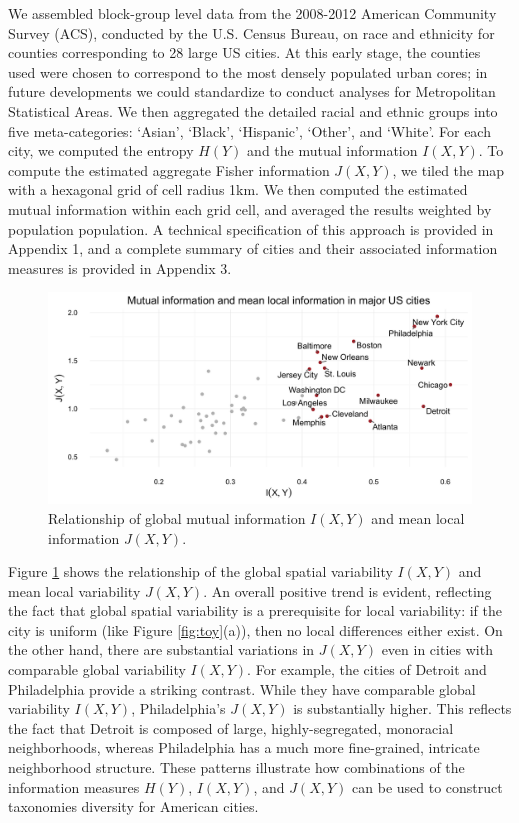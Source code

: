 We assembled block-group level data from the 2008-2012 American Community Survey (ACS), conducted by the U.S. Census Bureau, on race and ethnicity for counties corresponding to 28 large US cities. At this early stage, the counties used were chosen to correspond to the most densely populated urban cores; in future developments we could standardize to conduct analyses for Metropolitan Statistical Areas. We then aggregated the detailed racial and ethnic groups into five meta-categories: `Asian', `Black', `Hispanic', `Other', and `White'. For each city, we computed the entropy $H(Y)$ and the mutual information $I(X,Y)$. To compute the estimated aggregate Fisher information $J(X,Y)$, we tiled the map with a hexagonal grid of cell radius 1km. We then computed the estimated mutual information within each grid cell, and averaged the results weighted by population population. A technical specification of this approach is provided in Appendix 1, and a complete summary of cities and their associated information measures is provided in Appendix 3. 
		
	\begin{figure}
		\includegraphics[width=1\textwidth]{figs/mutual_fisher.png}
		\caption{Relationship of global mutual information $I(X,Y)$ and mean local information $J(X,Y)$.} 
		\label{fig:info_cross}
	\end{figure}	
Figure \ref{fig:info_cross} shows the relationship of the global spatial variability $I(X,Y)$ and mean local variability $J(X,Y)$. An overall positive trend is evident, reflecting the fact that global spatial variability is a prerequisite for local variability: if the city is uniform (like Figure \ref{fig:toy}(a)), then no local differences either exist.  On the other hand, there are substantial variations in $J(X,Y)$ even in cities with comparable global variability $I(X,Y)$. For example, the cities of Detroit and Philadelphia provide a striking contrast. While they have comparable global variability $I(X,Y)$, Philadelphia's $J(X,Y)$ is substantially higher. This reflects the fact that Detroit is composed of large, highly-segregated, monoracial neighborhoods, whereas Philadelphia has a much more fine-grained, intricate neighborhood structure. These patterns illustrate how combinations of the information measures $H(Y)$, $I(X,Y)$, and $J(X,Y)$ can be used to construct taxonomies diversity for American cities. 

